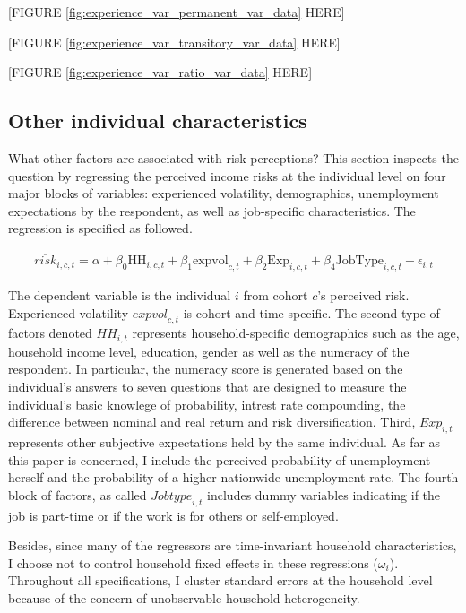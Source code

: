 \documentclass[12pt,notitlepage,onecolumn,aps,pra]{article}
\begin{document}
{[}FIGURE \ref{fig:experience_var_permanent_var_data} HERE{]}

{[}FIGURE \ref{fig:experience_var_transitory_var_data} HERE{]}

{[}FIGURE \ref{fig:experience_var_ratio_var_data} HERE{]}






    \hypertarget{other-individual-characteristics}{%
\subsection{Other individual
characteristics}\label{other-individual-characteristics}}

What other factors are associated with risk perceptions? This section
inspects the question by regressing the perceived income risks at the
individual level on four major blocks of variables: experienced
volatility, demographics, unemployment expectations by the respondent,
as well as job-specific characteristics. The regression is specified as
followed.

\begin{eqnarray}
\overline{risk}_{i,c,t} = \alpha + \beta_0 \textrm{HH}_{i,c,t} + \beta_1 \textrm{expvol}_{c,t} + \beta_2 \textrm{Exp}_{i,c,t} + \beta_4 \textrm{JobType}_{i,c,t} + \epsilon_{i,t}
\end{eqnarray}

The dependent variable is the individual \(i\) from cohort \(c\)'s
perceived risk. Experienced volatility \(\textit{expvol}_{c,t}\) is
cohort-and-time-specific. The second type of factors denoted
\(\textit{HH}_{i,t}\) represents household-specific demographics such as
the age, household income level, education, gender as well as the
numeracy of the respondent. In particular, the numeracy score is
generated based on the individual's answers to seven questions that are
designed to measure the individual's basic knowlege of probability,
intrest rate compounding, the difference between nominal and real return
and risk diversification. Third, \(\textit{Exp}_{i,t}\) represents other
subjective expectations held by the same individual. As far as this
paper is concerned, I include the perceived probability of unemployment
herself and the probability of a higher nationwide unemployment rate.
The fourth block of factors, as called \(\textit{Jobtype}_{i,t}\)
includes dummy variables indicating if the job is part-time or if the
work is for others or self-employed.

Besides, since many of the regressors are time-invariant household
characteristics, I choose not to control household fixed effects in
these regressions (\(\omega_i\)). Throughout all specifications, I
cluster standard errors at the household level because of the concern of
unobservable household heterogeneity.
\end{document}
